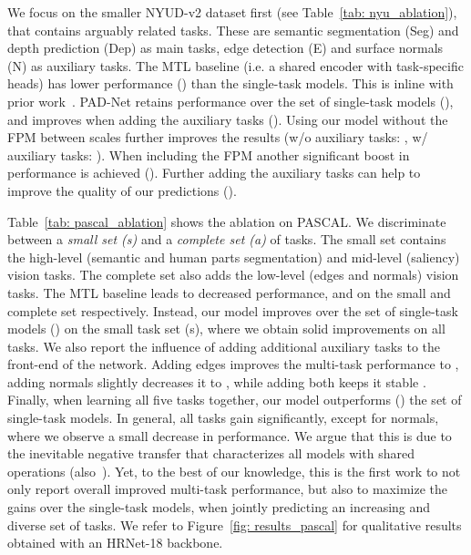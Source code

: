 \documentclass[runningheads]{llncs}
\begin{document}
We focus on the smaller NYUD-v2 dataset first (see Table~\ref{tab: nyu_ablation}), that contains arguably related tasks. These are semantic segmentation (Seg) and depth prediction (Dep) as main tasks, edge detection (E) and surface normals (N) as auxiliary tasks. The MTL baseline (i.e. a shared encoder with task-specific heads) has lower performance () than the single-task models. This is inline with prior work~\cite{vandenhende2019branched,maninis2019attentive}. PAD-Net retains performance over the set of single-task models (), and improves when adding the auxiliary tasks (). Using our model without the FPM between scales further improves the results (w/o auxiliary tasks: , w/ auxiliary tasks: ). When including the FPM another significant boost in performance is achieved (). Further adding the auxiliary tasks can help to improve the quality of our predictions ().

Table~\ref{tab: pascal_ablation} shows the ablation on PASCAL. We discriminate between a \textit{small set (s)} and a \textit{complete set (a)} of tasks. The small set contains the high-level (semantic and human parts segmentation) and mid-level (saliency) vision tasks. The complete set also adds the low-level (edges and normals) vision tasks. The MTL baseline leads to decreased performance,  and  on the small and complete set respectively. Instead, our model improves over the set of single-task models () on the small task set (s), where we obtain solid improvements on all tasks. We also report the influence of adding additional auxiliary tasks to the front-end of the network. Adding edges improves the multi-task performance to , adding normals slightly decreases it to , while adding both keeps it stable . Finally, when learning all five tasks together, our model outperforms () the set of single-task models. In general, all tasks gain significantly, except for normals, where we observe a small decrease in performance. We argue that this is due to the inevitable negative transfer that characterizes all models with shared operations (also~\cite{xu2018pad,maninis2019attentive,zhang2019pattern}). Yet, to the best of our knowledge, this is the first work to not only report overall improved multi-task performance, but also to maximize the gains over the single-task models, when jointly predicting an increasing and diverse set of tasks. We refer to Figure~\ref{fig: results_pascal} for qualitative results obtained with an HRNet-18 backbone.
\end{document}

